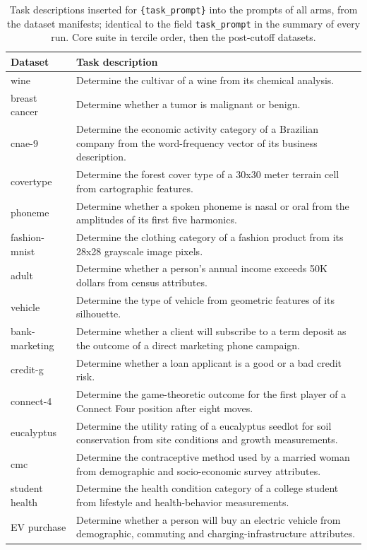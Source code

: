 \begin{table}[!t]
  \centering
  \small
  \caption[Task descriptions]{Task descriptions inserted for \texttt{\{task\_prompt\}} into the prompts of all arms, from the dataset manifests; identical to the field \texttt{task\_prompt} in the summary of every run. Core suite in tercile order, then the post-cutoff datasets.}
  \label{tab:C:tasks}
  \begin{tabularx}{\textwidth}{lL}
    \toprule
    Dataset & Task description \\
    \midrule
    wine & Determine the cultivar of a wine from its chemical analysis. \\
    breast cancer & Determine whether a tumor is malignant or benign. \\
    cnae-9 & Determine the economic activity category of a Brazilian company from the word-frequency vector of its business description. \\
    covertype & Determine the forest cover type of a 30x30 meter terrain cell from cartographic features. \\
    phoneme & Determine whether a spoken phoneme is nasal or oral from the amplitudes of its first five harmonics. \\
    fashion-mnist & Determine the clothing category of a fashion product from its 28x28 grayscale image pixels. \\
    adult & Determine whether a person's annual income exceeds 50K dollars from census attributes. \\
    vehicle & Determine the type of vehicle from geometric features of its silhouette. \\
    bank-marketing & Determine whether a client will subscribe to a term deposit as the outcome of a direct marketing phone campaign. \\
    credit-g & Determine whether a loan applicant is a good or a bad credit risk. \\
    connect-4 & Determine the game-theoretic outcome for the first player of a Connect Four position after eight moves. \\
    eucalyptus & Determine the utility rating of a eucalyptus seedlot for soil conservation from site conditions and growth measurements. \\
    cmc & Determine the contraceptive method used by a married woman from demographic and socio-economic survey attributes. \\
    \midrule
    student health & Determine the health condition category of a college student from lifestyle and health-behavior measurements. \\
    EV purchase & Determine whether a person will buy an electric vehicle from demographic, commuting and charging-infrastructure attributes. \\
    \bottomrule
  \end{tabularx}
\end{table}

